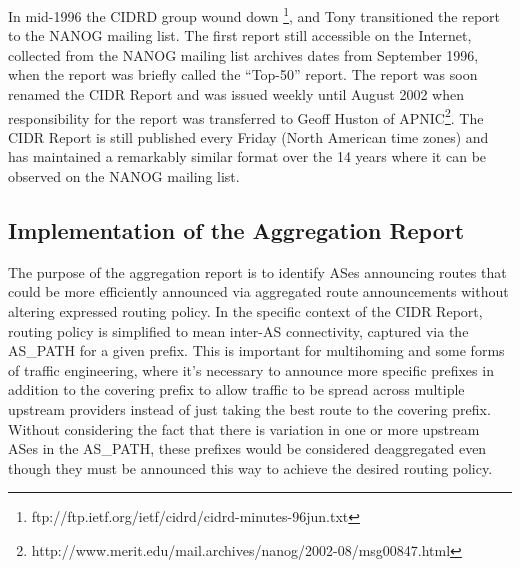 In mid-1996 the CIDRD group wound down \footnote{ftp://ftp.ietf.org/ietf/cidrd/cidrd-minutes-96jun.txt}, and Tony transitioned the report to the NANOG mailing list. The first report still accessible on the Internet, collected from the NANOG mailing list archives \cite{NANOG} dates from September 1996, when the report was briefly called the ``Top-50'' report. The report was soon renamed the CIDR Report and was issued weekly until August 2002 when responsibility for the report was transferred to Geoff Huston of APNIC\footnote{http://www.merit.edu/mail.archives/nanog/2002-08/msg00847.html}. The CIDR Report is still published every Friday (North American time zones) and has maintained a remarkably similar format over the 14 years where it can be observed on the NANOG mailing list.

\subsection{Implementation of the Aggregation Report}

The purpose of the aggregation report is to identify ASes announcing routes that could be more efficiently announced via aggregated route announcements without altering expressed routing policy. In the specific context of the CIDR Report, routing policy is simplified to mean inter-AS connectivity, captured via the AS\_PATH for a given prefix. This is important for multihoming and some forms of traffic engineering, where it's necessary to announce more specific prefixes in addition to the covering prefix to allow traffic to be spread across multiple upstream providers instead of just taking the best route to the covering prefix. Without considering the fact that there is variation in one or more upstream ASes in the AS\_PATH, these prefixes would be considered deaggregated even though they must be announced this way to achieve the desired routing policy.

